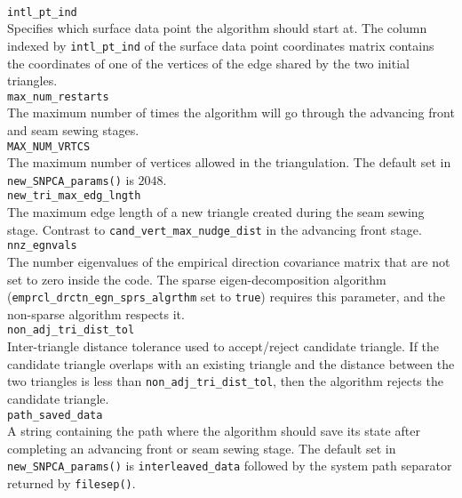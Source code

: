 \documentclass[11pt]{amsart}
\begin{document}
\\[\baselineskip]
\noindent
\verb+intl_pt_ind+\\
\noindent
Specifies which surface data point the algorithm should start at.
The column indexed by \verb+intl_pt_ind+ of the surface data point coordinates matrix contains the coordinates of one of the vertices of the edge shared by the two initial triangles.
\\[\baselineskip]
\noindent
\verb+max_num_restarts+\\
\noindent
The maximum number of times the algorithm will go through the advancing front and seam sewing stages.
\\[\baselineskip]
\noindent
\verb+MAX_NUM_VRTCS+\\
The maximum number of vertices allowed in the triangulation.
The default set in \verb+new_SNPCA_params()+ is $2048$.
\noindent
\\[\baselineskip]
\noindent
\verb+new_tri_max_edg_lngth+\\
\noindent
The maximum edge length of a new triangle created during the seam sewing stage.
Contrast to \verb+cand_vert_max_nudge_dist+ in the advancing front stage.
\\[\baselineskip]
\noindent
\verb+nnz_egnvals+\\
\noindent
The number eigenvalues of the empirical direction covariance matrix that are not set to zero inside the code.
The sparse eigen-decomposition algorithm (\verb+emprcl_drctn_egn_sprs_algrthm+ set to \verb+true+) requires this parameter, and the non-sparse algorithm respects it.
\\[\baselineskip]
\noindent
\verb+non_adj_tri_dist_tol+\\
\noindent
Inter-triangle distance tolerance used to accept/reject candidate triangle.
If the candidate triangle overlaps with an existing triangle and the distance between the two triangles is less than \verb+non_adj_tri_dist_tol+, then the algorithm rejects the candidate triangle.
\\[\baselineskip]
\noindent
\verb+path_saved_data+\\
A string containing the path where the algorithm should save its state after completing an advancing front or seam sewing stage.
The default set in \verb+new_SNPCA_params()+ is \verb+interleaved_data+ followed by the system path separator returned by \verb+filesep()+.
\noindent
\end{document}
